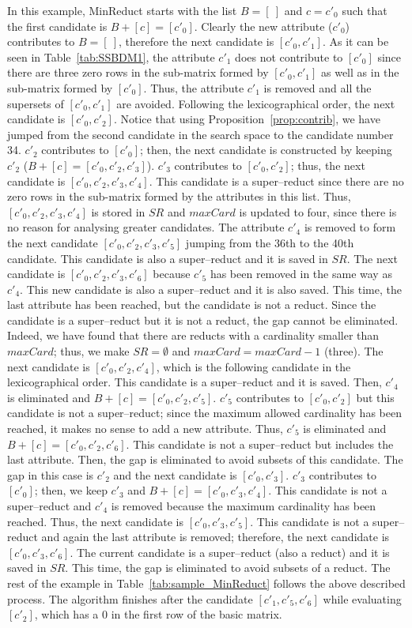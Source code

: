 \documentclass[authoryear,preprint,review,12pt]{elsarticle}
\begin{document}
	In this example, MinReduct starts with the list $B=[~]$ and $c=c'_0$ such that the first candidate is $B+[c]=[c'_0]$. Clearly the new attribute ($c'_0$) contributes to $B=[~]$, therefore the next candidate is $[c'_0,c'_1]$. As it can be seen in Table~\ref{tab:SSBDM1}, the attribute $c'_1$ does not contribute to $[c'_0]$ since there are three zero rows in the sub-matrix formed by $[c'_0,c'_1]$ as well as in the sub-matrix formed by $[c'_0]$. Thus, the attribute $c'_1$ is removed and all the supersets of $[c'_0,c'_1]$ are avoided. Following the lexicographical order, the next candidate is $[c'_0,c'_2]$. Notice that using Proposition~\ref{prop:contrib}, we have jumped from the second candidate in the search space to  the candidate number 34. $c'_2$ contributes to $[c'_0]$; then, the next candidate is constructed by keeping $c'_2$ ($B+[c]=[c'_0,c'_2,c'_3]$). $c'_3$ contributes to $[c'_0,c'_2]$; thus, the next candidate is $[c'_0,c'_2,c'_3,c'_4]$. This candidate is a super--reduct since there are no zero rows in the sub-matrix formed by the attributes in this list. Thus,  $[c'_0,c'_2,c'_3,c'_4]$ is stored in $SR$ and $maxCard$ is updated to four, since there is no reason for analysing greater candidates. The attribute $c'_4$ is removed to form the next candidate $[c'_0,c'_2,c'_3,c'_5]$ jumping from the 36th to the 40th candidate. This candidate is also a super--reduct and it is saved in $SR$. The next candidate is $[c'_0,c'_2,c'_3,c'_6]$ because $c'_5$ has been removed in the same way as $c'_4$. This new candidate is also a super--reduct and it is also saved. This time, the last attribute has been reached, but the candidate is not a reduct. Since the candidate is a super--reduct but it is not a reduct, the gap cannot be eliminated. Indeed, we have found that there are reducts with a cardinality smaller than $maxCard$; thus, we make $SR = \emptyset$ and $maxCard = maxCard-1$ (three). The next candidate is $[c'_0,c'_2,c'_4]$, which is the following candidate in the lexicographical order. This candidate is a super--reduct and it is saved. Then, $c'_4$ is eliminated and $B+[c]=[c'_0,c'_2,c'_5]$. $c'_5$ contributes to $[c'_0,c'_2]$ but this candidate is not a super--reduct; since the maximum allowed cardinality has been reached, it makes no sense to add a new attribute. Thus, $c'_5$ is eliminated and $B+[c]=[c'_0,c'_2,c'_6]$. This candidate is not a super--reduct but includes the last attribute. Then, the gap is eliminated to avoid subsets of this candidate. The gap in this case is $c'_2$ and the next candidate is $[c'_0,c'_3]$. $c'_3$ contributes to $[c'_0]$; then, we keep $c'_3$ and $B+[c]=[c'_0,c'_3,c'_4]$. This candidate is not a super--reduct and $c'_4$ is removed because the maximum cardinality has been reached. Thus, the next candidate is $[c'_0,c'_3,c'_5]$. This candidate is not a super--reduct and again the last attribute is removed; therefore, the next candidate is $[c'_0,c'_3,c'_6]$. The current candidate is a super--reduct (also a reduct) and it is saved in $SR$. This time, the gap is eliminated to avoid subsets of a reduct. The rest of the example in Table~\ref{tab:sample_MinReduct} follows the above described process. The algorithm finishes after the candidate $[c'_1,c'_5,c'_6]$ while evaluating $[c'_2]$, which has a 0 in the first row of the basic matrix.
	
\end{document}
